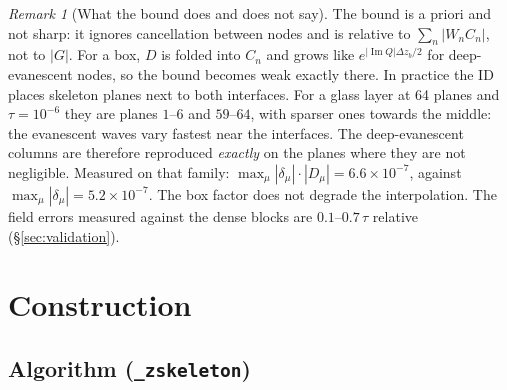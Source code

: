 \documentclass[11pt,a4paper]{article}
\newcommand{\code}[1]{\texttt{#1}}
\newcommand{\abs}[1]{\left\lvert #1 \right\rvert}
\theoremstyle{remark}
\newtheorem{remark}{Remark}
\begin{document}
\begin{remark}[What the bound does and does not say]
The bound is a priori and not sharp: it ignores cancellation between nodes and is relative to
$\sum_n\abs{W_n C_n}$, not to $\abs{G}$.
For a box, $D$ is folded into $C_n$ and grows like $e^{\abs{\operatorname{Im}Q}\Delta z_b/2}$ for deep-evanescent nodes,
so the bound becomes weak exactly there. In practice the ID places skeleton planes next to both interfaces.
For a glass layer at 64 planes and $\tau=10^{-6}$ they are planes $1$--$6$ and $59$--$64$, with sparser ones towards the middle:
the evanescent waves vary fastest near the interfaces. The deep-evanescent columns are therefore reproduced
\emph{exactly} on the planes where they are not negligible. Measured on that family: $\max_\mu \abs{\delta_\mu}\cdot\abs{D_\mu} = 6.6\times10^{-7}$,
against $\max_\mu\abs{\delta_\mu} = 5.2\times10^{-7}$. The box factor does not degrade the interpolation.
The field errors measured against the dense blocks are $0.1$--$0.7\,\tau$ relative (\S\ref{sec:validation}).
\end{remark}

\section{Construction}
\label{sec:construction}

\subsection{Algorithm (\code{\_zskeleton})}
\end{document}

